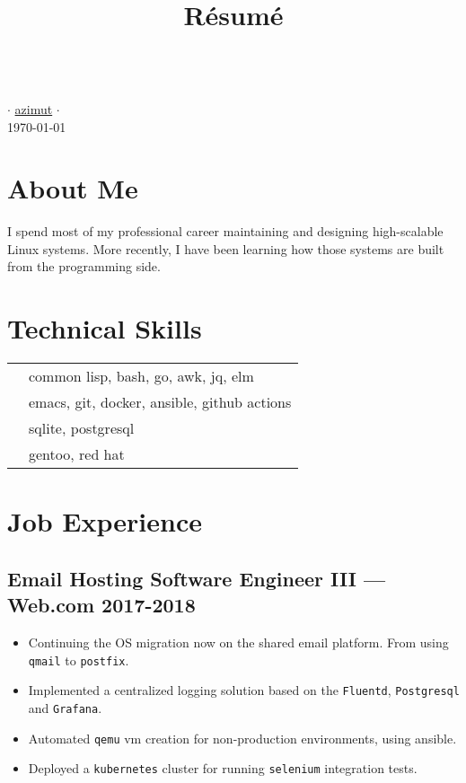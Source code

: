 \documentclass[11pt]{article}
\renewcommand{\maketitle}{
  \begin{center}{\huge\bfseries\theauthor} \\
    \vspace{.25em}
    {\faEnvelope} \href {mailto:\MAILTO} {\expandafter\randomize\expandafter{\MAILTO}} $\cdot$
    {\faGithub} \href {https://github.com/azimut} {azimut} $\cdot$
    {\faLinkedin} \href {https://www.linkedin.com/in/\LINKEDIN} {\LINKEDIN} \\
    \vspace{.25em}
    \today
  \end{center}
}
\begin{document}
\title{R\'esum\'e}
\author{\FULLNAME}

\maketitle


\begin{multicols}{2}
\section{About Me}
I spend most of my professional career maintaining and designing high-scalable Linux systems. More recently, I have been learning how those systems are built from the programming side. \columnbreak
  \section{Technical Skills}
  \begin{tabular}{@{}cl@{}}
    \hspace{.1em} \raisebox{-0.2\height}{\faCode}     & common lisp, bash, go, awk, jq, elm \\
    \hspace{.1em} \raisebox{-0.2\height}{\faWrench}   & emacs, git, docker, ansible, github actions \\
    \hspace{.1em} \raisebox{-0.2\height}{\faDatabase} & sqlite, postgresql \\
    \hspace{.1em} \raisebox{-0.2\height}{\faLinux}    & gentoo, red hat
  \end{tabular}
\end{multicols}


\section{Job Experience}


\subsection{Email Hosting Software Engineer III --- Web.com \hfill 2017-2018}
\begin{itemize}
\item Continuing the OS migration now on the shared email platform. From using \texttt{qmail} to \texttt{postfix}.
\item Implemented a centralized logging solution based on the \texttt{Fluentd}, \texttt{Postgresql} and \texttt{Grafana}.
\item Automated \texttt{qemu} vm creation for non-production environments, using ansible.
\item Deployed a \texttt{kubernetes} cluster for running \texttt{selenium} integration tests.
\end{itemize}
\end{document}
